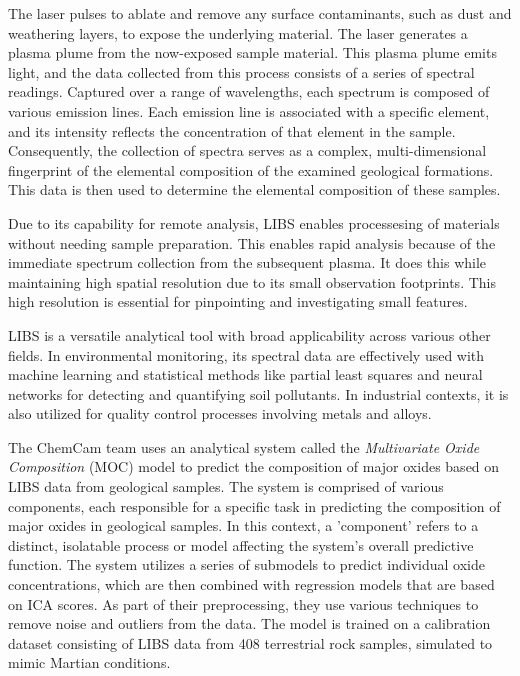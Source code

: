 The laser pulses to ablate and remove any surface contaminants, such as dust and weathering layers, to expose the underlying material. The laser generates a plasma plume from the now-exposed sample material.
This plasma plume emits light, and the data collected from this process consists of a series of spectral readings. Captured over a range of wavelengths, each spectrum is composed of various emission lines. Each emission line is associated with a specific element, and its intensity reflects the concentration of that element in the sample.
Consequently, the collection of spectra serves as a complex, multi-dimensional fingerprint of the elemental composition of the examined geological formations.
This data is then used to determine the elemental composition of these samples.\cite{cleggRecalibrationMarsScience2017}

Due to its capability for remote analysis, LIBS enables processesing of materials without needing sample preparation. This enables rapid analysis because of the immediate spectrum collection from the subsequent plasma. It does this while maintaining high spatial resolution due to its small observation footprints. This high resolution is essential for pinpointing and investigating small features. \cite{wiensChemcam2012}

LIBS is a versatile analytical tool with broad applicability across various other fields. In environmental monitoring, its spectral data are effectively used with machine learning and statistical methods like partial least squares and neural networks for detecting and quantifying soil pollutants. In industrial contexts, it is also utilized for quality control processes involving metals and alloys\cite{huang_progress_2023}.

The ChemCam team uses an analytical system called the \textit{Multivariate Oxide Composition} (MOC) model to predict the composition of major oxides based on LIBS data from geological samples.
The system is comprised of various components, each responsible for a specific task in predicting the composition of major oxides in geological samples.
In this context, a 'component' refers to a distinct, isolatable process or model affecting the system's overall predictive function.
The system utilizes a series of submodels to predict individual oxide concentrations, which are then combined with regression models that are based on ICA scores.
As part of their preprocessing, they use various techniques to remove noise and outliers from the data.\cite{cleggRecalibrationMarsScience2017}
The model is trained on a calibration dataset consisting of LIBS data from 408 terrestrial rock samples, simulated to mimic Martian conditions\cite{cleggRecalibrationMarsScience2017}.

